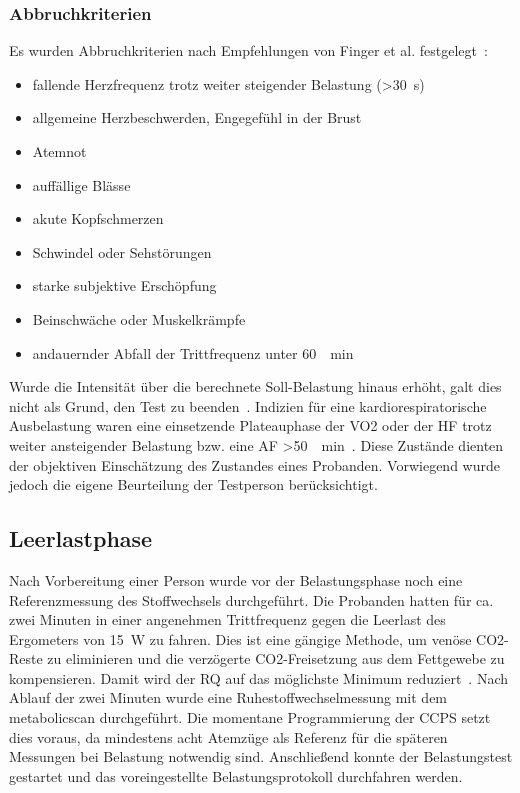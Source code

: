 \subsubsection{Abbruchkriterien}
%
Es wurden Abbruchkriterien nach Empfehlungen von Finger et al. festgelegt~\cite{Finger.2013}:
%
\begin{itemize}
	\item fallende Herzfrequenz trotz weiter steigender Belastung (>\SI{30}{\second})
	\item allgemeine Herzbeschwerden, Engegefühl in der Brust
	\item Atemnot
	\item auffällige Blässe
	\item akute Kopfschmerzen
	\item Schwindel oder Sehstörungen
	\item starke subjektive Erschöpfung
	\item Beinschwäche oder Muskelkrämpfe
	\item andauernder Abfall der Trittfrequenz unter \SI{60}{\per\minute}
\end{itemize}
%
Wurde die Intensität über die berechnete Soll-Belastung hinaus erhöht, galt dies nicht als Grund, den Test zu beenden~\cite{Wonisch.2008}. Indizien für eine kardiorespiratorische Ausbelastung waren eine einsetzende Plateauphase der \gls{VO2} oder der \gls{HF} trotz weiter ansteigender Belastung bzw. eine \gls{AF} >\SI{50}{\per\minute}~\cite{Kroidl.2015}. Diese Zustände dienten der objektiven Einschätzung des Zustandes eines Probanden. Vorwiegend wurde jedoch die eigene Beurteilung der Testperson berücksichtigt. 
%
\subsection{Leerlastphase}
%
Nach Vorbereitung einer Person wurde vor der Belastungsphase noch eine Referenzmessung des Stoffwechsels durchgeführt. Die Probanden hatten für ca. zwei Minuten in einer angenehmen Trittfrequenz gegen die Leerlast des Ergometers von \SI{15}{\watt} zu fahren. Dies ist eine gängige Methode, um venöse \gls{CO2}-Reste zu eliminieren und die verzögerte \gls{CO2}-Freisetzung aus dem Fettgewebe zu kompensieren. Damit wird der \gls{RQ} auf das möglichste Minimum reduziert~\cite{Kroidl.2015}. Nach Ablauf der zwei Minuten wurde eine Ruhestoffwechselmessung mit dem metabolicscan durchgeführt. Die momentane Programmierung der \gls{CCPS} setzt dies voraus, da mindestens acht Atemzüge als Referenz für die späteren Messungen bei Belastung notwendig sind. Anschließend konnte der Belastungstest gestartet und das voreingestellte Belastungsprotokoll durchfahren werden.
%
